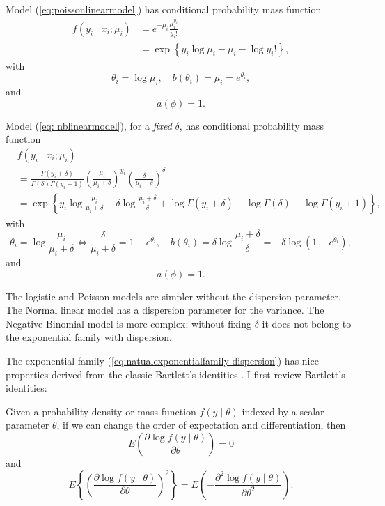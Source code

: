 \begin{example}[continued]\label{eg::countpoissonmodel-continue}
 Model (\ref{eq:poissonlinearmodel}) has conditional probability mass
function
\begin{align*}
f(y_{i}  \mid x_{i};\mu_{i}) &=e^{-\mu_{i}}\frac{\mu_{i}^{y_i}}{y_i!} \\
&  =\exp\left\{ y_{i}\log\mu_{i}-\mu_{i}-\log y_{i}!\right\} ,
\end{align*}
with
\[
\theta_{i}=\log\mu_{i},\quad b(\theta_{i})=\mu_{i}=e^{\theta_{i}},
\]
and
$$
a(\phi)=1.
$$
\end{example}


\begin{example}[continued]\label{eg::countnbmodel-continue}
 Model (\ref{eq: nblinearmodel}), for a {\it fixed} $\delta$, has conditional
probability mass function
\begin{align*}
&f(y_{i}  \mid x_{i};\mu_{i})  \\
& =\frac{\Gamma(y_{i}+\delta)}{\Gamma(\delta )\Gamma(y_{i}+1)}\left(\frac{\mu_{i}}{\mu_{i}+\delta}\right)^{y_{i}}\left(\frac{\delta}{\mu_{i}+\delta}\right)^{\delta}\\
 & =\exp\left\{ y_{i}\log\frac{\mu_{i}}{\mu_{i}+\delta}-\delta\log\frac{\mu_{i}+\delta}{\delta}  
  +\log\Gamma(y_{i}+\delta)-\log\Gamma(\delta)-\log\Gamma(y_{i}+1)\right\} ,
\end{align*}
with 
\[
\theta_{i}=\log\frac{\mu_{i}}{\mu_{i}+\delta}  \Longleftrightarrow  \frac{\delta}{  \mu_{i}+\delta  } = 1- e^{\theta_i}  ,
\quad b(\theta_{i})=\delta\log\frac{\mu_{i}+\delta}{\delta}= - \delta\log (1-e^{\theta_{i}}) ,
\]
and
$$
 a(\phi)=1.
$$
\end{example}



 

The logistic and Poisson models are simpler without the dispersion parameter.
The Normal linear model has a dispersion parameter for the variance.
The Negative-Binomial model is more complex: without fixing $\delta$
it does not belong to the exponential family with dispersion. 

The exponential family (\ref{eq:natualexponentialfamily-dispersion})
has nice properties derived from the classic Bartlett's identities \citep{bartlett1953approximate}.
I first review Bartlett's identities:
\begin{lemma}
\label{lemma:bartlett-identity}Given a probability density or mass
function $f(y\mid\theta)$ indexed by a scalar parameter $\theta$, if we can
change the order of expectation and differentiation, then
$$
E\left(\frac{\partial\log f(y\mid\theta)}{\partial\theta}\right)=0
$$
and
$$
E\left\{ \left(\frac{\partial\log f(y\mid\theta)}{\partial\theta}\right)^{2}\right\} =E\left(-\frac{\partial^{2}\log f(y\mid\theta)}{\partial\theta^{2}}\right).
$$
\end{lemma}

